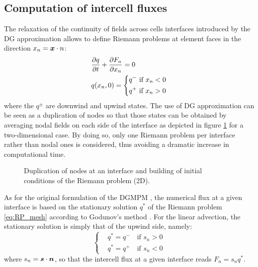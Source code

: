 \subsection{Computation of intercell fluxes}
The relaxation of the continuity of fields across cells interfaces introduced by the DG approximation allows to define Riemann problems at element faces in the direction $x_n={\mathbf{\boldsymbol{x}}}\cdot{n}$:
\begin{equation}
  \label{eq:RP_mesh}
  \begin{aligned}
    &\frac{\partial q}{\partial t} + \frac{\partial F_n}{\partial x_n} = 0  \\
    & q(x_n,0)= \left\lbrace 
      \begin{aligned}
        & q^{-} \text{ if } x_n <0 \\
        & q^{+} \text{ if } x_n > 0
      \end{aligned}
        \right.
  \end{aligned}
\end{equation}
where the $q^{\pm}$ are downwind and upwind states.
The use of DG approximation can be seen as a duplication of nodes so that those states can be obtained by averaging nodal fields on each side of the interface as depicted in figure \ref{fig:2D_edge} for a two-dimensional case.
By doing so, only one Riemann problem per interface rather than nodal ones is considered, thus avoiding a dramatic increase in computational time.
\begin{figure}[h!]
  \centering
  
  \caption{Duplication of nodes at an interface and building of initial conditions of the Riemann problem (2D).}
  \label{fig:2D_edge}
\end{figure}
As for the original formulation of the DGMPM \cite{DGMPM}, the numerical flux at a given interface is based on the stationary solution $q^*$ of the Riemann problem \eqref{eq:RP_mesh} according to Godunov's method \cite{Godunov_method}.
For the linear advection, the stationary solution is simply that of the upwind side, namely:
\begin{equation}
  \label{eq:stationary_state}
  \left\lbrace
    \begin{aligned}
      & q^* = q^{-} \quad \text{if $s_n>0$}\\
      & q^* = q^{+} \quad \text{if $s_n<0$}
    \end{aligned}
    \right.
\end{equation}
where $s_n={\mathbf{\boldsymbol{s}}}\cdot{\mathbf{\boldsymbol{n}}}$, so that the intercell flux at a given interface reads $F_n=s_n q^*$.

